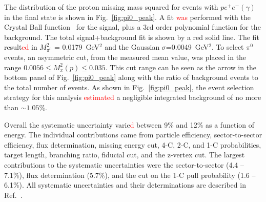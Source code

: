 \documentclass[aps,prc,twocolumn,floatfix,showpacs,preprintnumbers,amsmath,amssymb,superscriptaddress,linenumbers]{revtex4-1}
\def\pizT{$\pi^{0} \ $}
\begin{document}
The distribution of the proton missing mass squared for events with 
$pe^+e^-(\gamma)$ in the final state is shown in Fig.~\ref{fig:pi0_peak}. 
A fit \textcolor{red}{was} performed with the Crystal Ball function~\cite{Oreglia:1980cs,
Skwarnicki:1986xj} for the signal, plus a 3rd order polynomial function 
for the background. The total signal+background fit is shown by a red solid 
line. The fit result\textcolor{red}{ed} in $M_{\pi^0}^2$ = 0.0179~GeV$^2$ and the Gaussian 
$\sigma$=0.0049~GeV$^2$. To select \pizT events, an asymmetric cut, from 
the measured mean value, was placed in the range $0.0056 \le  M_x^2(p) 
\le 0.035$. This cut range can be seen as the arrow in the bottom 
panel of Fig.~\ref{fig:pi0_peak} along with the ratio of background 
events to the total number of events. As shown in Fig.~\ref{fig:pi0_peak}, 
the event selection strategy for this analysis \textcolor{red}{estimated} a 
negligible integrated background of no more than $\sim1.05\%$.

Overall the systematic uncertainty varie\textcolor{red}{d} between 9\% and 12\% as a function of energy. The individual 
contributions came from particle efficiency, sector-to-sector efficiency, 
flux determination, missing energy cut, 4-C, 2-C, and 1-C probabilities, 
target length, branching ratio, fiducial cut, and the z-vertex cut.
The largest contributions to the systematic uncertainties 
were the sector-to-sector (4.4 -- 7.1\%), flux determination (5.7\%),
and the cut on the 1-C pull probability (1.6 -- 6.1\%). All systematic 
uncertainties and their determinations are described in Ref.~\cite{Kunkel}.

\end{document}
